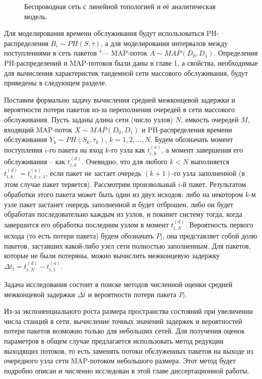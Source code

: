 \begin{figure}[h]
  \caption{Беспроводная сеть с линейной топологией и её аналитическая модель.}
  \label{fig:ch4_network_model}
\end{figure}

Для моделирования времени обслуживания будут использоваться PH-распределения $B_i \sim PH(S, \overline{\tau})$, а для моделирования интервалов между поступлениями в сеть пакетов "--- MAP-поток $A \sim MAP(D_0, D_1)$. Определения PH-распределений и MAP-потоков были даны в главе 1, а свойства, необходимые для вычисления характеристик тандемной сети массового обслуживания, будут приведены в следующем разделе.

Поставим формально задачу вычисления средней межконцевой задержки и вероятности потери пакетов из-за переполнения очередей в сети массового обслуживания. Пусть заданы длина сети (число узлов) $N$, емкость очередей $M$, входящий MAP-поток $X \sim MAP(D_0, D_1)$ и PH-распределения времени обслуживания $Y_k \sim PH(S_k, \overline{\tau}_k)$, $k = 1, 2, \dots, N$. Будем обозначать момент поступления $i$-го пакета на вход $k$-го узла как $t_{i,k}^{(a)}$, а момент завершения его обслуживания -- как $t_{i,k}^{(d)}$. Очевидно, что для любого $k < N$ выполняется $t_{i,k}^{(d)} = t_{i,{k+1}}^{(a)}$, если пакет не застает очередь $(k+1)$-го узла заполненной (в этом случае пакет теряется). Рассмотрим произвольный $i$-й пакет. Результатом обработки этого пакета может быть один из двух исходов: либо на некотором $k$-м узле пакет застанет очередь заполненной и будет отброшен, либо он будет обработан последовательно каждым из узлов, и покинет систему тогда, когда завершится его обработка последним узлом в момент $t_{i,N}^{(d)}$. Вероятность первого исхода (то есть потери пакета) будем обозначать $P_l$, она представляет собой долю пакетов, заставших какой-либо узел сети полностью заполненным. Для пакетов, которые не были потеряны, можно вычислить межконцевую задержку $\Delta t_i = t^{(d)}_{i,N} - t^{(a)}_{i,1}$.

Задача исследования состоит в поиске методов численной оценки средней межконцевой задержки $\overline{\Delta t}$ и вероятности потери пакета $P_l$.

Из-за экспоненциального роста размера пространства состояний при увеличении числа станций в сети, вычисление точных значений задержек и вероятностей потери пакетов возможно только для небольших сетей. Для получения оценок параметров в общем случае предлагается использовать метод редукции выходящих потоков, то есть заменять потоки обслуженных пакетов на выходе из очередного узла сети MAP-потоком небольшого размера. Этот метод будет подробно описан и численно исследован в этой главе диссертационной работы.


